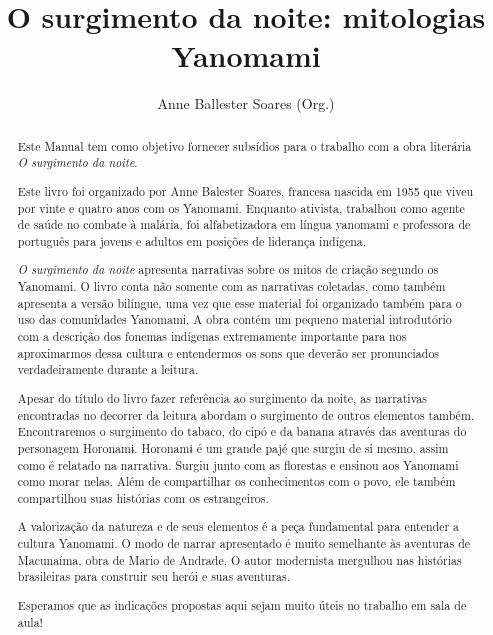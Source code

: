 \documentclass[12pt]{extarticle}
\begin{document}
\newcommand{\AutorLivro}{Anne Ballester Soares (Org.)}
\newcommand{\TituloLivro}{O surgimento da noite: mitologias Yanomami}
\newcommand{\Tema}{Ficção, mistério e fantasia}
\newcommand{\Genero}{Mitologia indígena}
\newcommand{\imagemCapa}{./images/PNLD0029-01.png}
\newcommand{\issnppub}{---}
\newcommand{\issnepub}{---}
\newcommand{\colaborador}{Alessandra Cabral, Vicente Castro, Bruno Gradella}


\title{\TituloLivro}
\author{\AutorLivro}
\def\authornotes{\colaborador}

\date{}
\maketitle




\begin{abstract}
Este Manual tem como objetivo fornecer subsídios para o trabalho com a
obra literária \emph{O surgimento da noite}.

Este livro foi organizado por Anne Balester Soares, francesa nascida em 1955 
que viveu por vinte e quatro anos com os Yanomami. Enquanto ativista, trabalhou como agente 
de saúde no combate à malária, foi alfabetizadora em língua yanomami e professora 
de português para jovens e adultos em posições de liderança indígena.

\emph{O surgimento da noite} apresenta narrativas sobre os mitos de criação segundo 
os Yanomami. O livro conta não somente com as narrativas coletadas, como também 
apresenta a versão bilíngue, uma vez que esse material foi organizado também para o uso 
das comunidades Yanomami. A obra contém um pequeno material introdutório 
com a descrição dos fonemas indígenas extremamente importante para nos 
aproximarmos dessa cultura e entendermos os sons que deverão ser pronunciados 
verdadeiramente durante a leitura. 

Apesar do título do livro fazer referência ao surgimento da noite, as narrativas
encontradas no decorrer da leitura abordam o surgimento de outros elementos
também. Encontraremos o surgimento do tabaco, do cipó e da banana através
das aventuras do personagem Horonamɨ. Horonamɨ é um grande pajé que surgiu de si mesmo, 
assim como é relatado na narrativa. Surgiu junto com as florestas e ensinou aos Yanomami 
como morar nelas. Além de compartilhar os conhecimentos com o povo, ele também
compartilhou suas histórias com os estrangeiros.

A valorização da natureza e de seus elementos é a peça fundamental para entender 
a cultura Yanomami. O modo de narrar apresentado é muito semelhante às aventuras 
de Macunaíma, obra de Mario de Andrade. O autor modernista mergulhou nas histórias 
brasileiras para construir seu herói e suas aventuras.

Esperamos que as indicações propostas aqui sejam muito úteis no trabalho em
sala de aula! 


\end{abstract}
\end{document}
